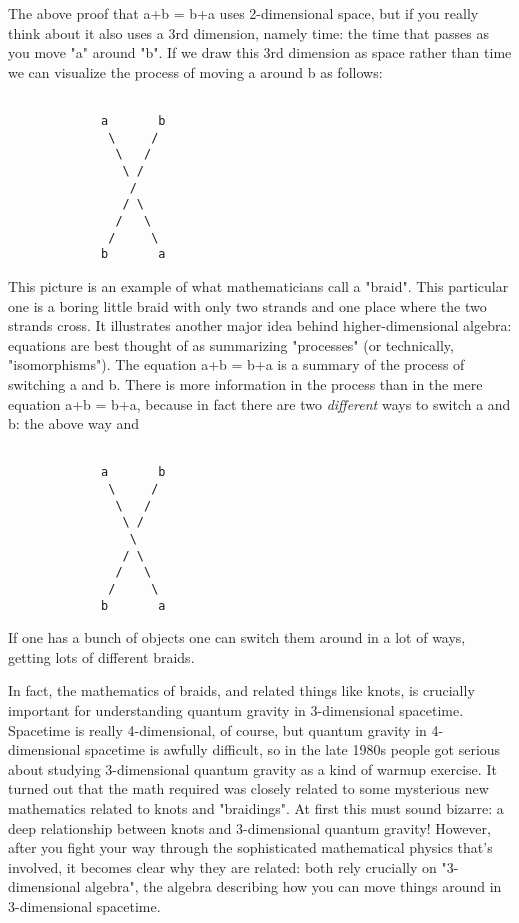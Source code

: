 The above proof that a+b = b+a uses 2-dimensional space, but if you
really think about it also uses a 3rd dimension, namely time: the time
that passes as you move "a" around "b".  If we draw this 3rd dimension
as space rather than time we can visualize the process of moving a
around b as follows:


\begin{verbatim}

             a       b
              \     /
               \   /
                \ /
                 /
                / \
               /   \
              /     \
             b       a

\end{verbatim}
    
This picture is an example of what mathematicians call a "braid".
This particular one is a boring little braid with only two strands and
one place where the two strands cross.  It illustrates another major
idea behind higher-dimensional algebra: equations are best thought of
as summarizing "processes" (or technically, "isomorphisms").  The
equation a+b = b+a is a summary of the process of switching a and b.
There is more information in the process than in the mere equation a+b
= b+a, because in fact there are two \emph{different} ways to switch a and
b: the above way and


\begin{verbatim}

             a       b
              \     /
               \   /
                \ /
                 \
                / \
               /   \
              /     \
             b       a

\end{verbatim}
    
If one has a bunch of objects one can switch them around in a lot
of ways, getting lots of different braids.  

In fact, the mathematics of braids, and related things like knots, is
crucially important for understanding quantum gravity in 3-dimensional
spacetime.  Spacetime is really 4-dimensional, of course, but quantum
gravity in 4-dimensional spacetime is awfully difficult, so in the
late 1980s people got serious about studying 3-dimensional quantum
gravity as a kind of warmup exercise.  It turned out that the math
required was closely related to some mysterious new mathematics
related to knots and "braidings".  At first this must sound bizarre: a
deep relationship between knots and 3-dimensional quantum gravity!
However, after you fight your way through the sophisticated
mathematical physics that's involved, it becomes clear why they are
related: both rely crucially on "3-dimensional algebra", the algebra
describing how you can move things around in 3-dimensional spacetime.


